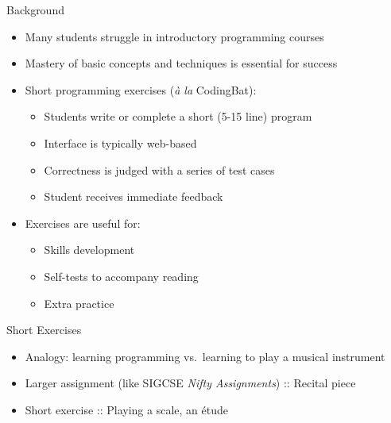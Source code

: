 \documentclass{beamer}
\begin{document}
\begin{frame}{Background}

\begin{itemize}
  \item Many students struggle in introductory programming courses
  \item Mastery of basic concepts and techniques is essential for success
  \item Short programming exercises ({\it {\` a} la} CodingBat):
  \begin{itemize}
    \item Students write or complete a short (5-15 line) program
    \item Interface is typically web-based
    \item Correctness is judged with a series of test cases
    \item Student receives immediate feedback
  \end{itemize}
  \item Exercises are useful for:
  \begin{itemize}
    \item Skills development
    \item Self-tests to accompany reading
    \item Extra practice
  \end{itemize}
\end{itemize}

\end{frame}


\begin{frame}{Short Exercises}

\begin{itemize}
  \item Analogy: learning programming vs.\ learning to play a musical instrument
  \item Larger assignment (like SIGCSE {\em Nifty Assignments}) :: Recital piece
  \item Short exercise :: Playing a scale, an {\' e}tude
\end{itemize}

\end{frame}
\end{document}
